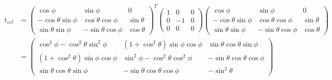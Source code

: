 \documentclass{ttuthes2007}
\begin{document}
\begin{equation*}                                                               
\begin{split}
t_{\alpha\beta} & =                                                                  
 \begin{pmatrix}                                                                
    \cos\phi & \sin\phi & 0 \\                                                            
    -\cos\theta \sin\phi & \cos\theta \cos\phi & \sin\theta \\                                                            
    \sin\theta \sin\phi & -\sin\theta \cos\phi & \cos\theta                                                              
 \end{pmatrix}^T                                                                  
\begin{pmatrix}                                                                
    1 & 0 & 0 \\                                                            
    0 & -1 & 0 \\                                                            
    0 & 0 & 0                                                               
 \end{pmatrix}       
 \begin{pmatrix}                                                                
    \cos\phi & \sin\phi & 0 \\                                                     
    -\cos\theta \sin\phi & \cos\theta \cos\phi & \sin\theta \\                        
    \sin\theta \sin\phi & -\sin\theta \cos\phi & \cos\theta                           
 \end{pmatrix}\\  
            &=
     \begin{pmatrix}                                                                 
    \cos^2\phi-\cos^2\theta\sin^2\phi & (1+\cos^2\theta)\sin\phi\cos\phi &
\sin\theta\cos\theta\sin\phi \\                                                                
    (1+\cos^2\theta)\sin\phi\cos\phi & \sin^2\phi-\cos^2\theta\cos^2\phi &
-\sin\theta\cos\theta\cos\phi \\                                                               
    \sin\theta\cos\theta\sin\phi & -\sin\theta\cos\theta\cos\phi & -\sin^2\theta                                                                   
 \end{pmatrix}     
\end{split}     
\end{equation*}   
\end{document}
